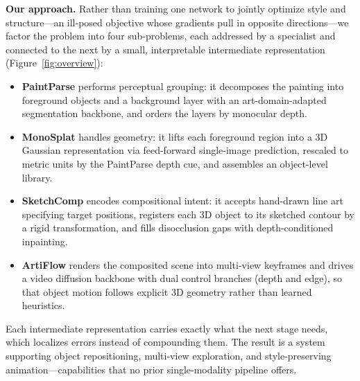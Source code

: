 \smallskip
\noindent\textbf{Our approach.}
Rather than training one network to jointly optimize style and
structure---an ill-posed objective whose gradients pull in opposite
directions---we factor the problem into four sub-problems, each
addressed by a specialist and connected to the next by a small,
interpretable intermediate representation (Figure~\ref{fig:overview}):

\begin{itemize}
    \item \textbf{PaintParse} performs perceptual grouping: it
    decomposes the painting into foreground objects and a background
    layer with an art-domain-adapted segmentation backbone, and orders
    the layers by monocular depth.
    \item \textbf{MonoSplat} handles geometry: it lifts each foreground
    region into a 3D Gaussian representation via feed-forward
    single-image prediction, rescaled to metric units by the PaintParse
    depth cue, and assembles an object-level library.
    \item \textbf{SketchComp} encodes compositional intent: it accepts
    hand-drawn line art specifying target positions, registers each 3D
    object to its sketched contour by a rigid transformation, and fills
    disocclusion gaps with depth-conditioned inpainting.
    \item \textbf{ArtiFlow} renders the composited scene into
    multi-view keyframes and drives a video diffusion backbone with
    dual control branches (depth and edge), so that object motion
    follows explicit 3D geometry rather than learned heuristics.
\end{itemize}

Each intermediate representation carries exactly what the next stage
needs, which localizes errors instead of compounding them. The result
is a system supporting object repositioning, multi-view exploration,
and style-preserving animation---capabilities that no prior
single-modality pipeline offers.

